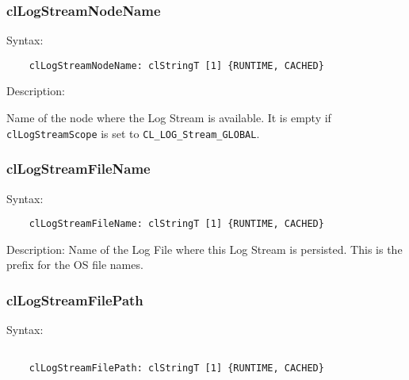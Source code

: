 \begin{flushleft}
\subsubsection{clLogStreamNodeName}
\begin{Desc}
\item[Syntax:]
\footnotesize\begin{verbatim}        	
	clLogStreamNodeName: clStringT [1] {RUNTIME, CACHED}
	\end{verbatim}
	\normalsize
	\end{Desc}
\begin{Desc}
\item[Description:]

Name of the node where the Log Stream is available. It is empty if {\tt{clLogStreamScope}} is set to {\tt{CL\_\-LOG\_\-Stream\_\-GLOBAL}}.
\end{Desc}


\subsubsection{clLogStreamFileName}
\begin{Desc}
\item[Syntax:]
\footnotesize\begin{verbatim}        	
	clLogStreamFileName: clStringT [1] {RUNTIME, CACHED}
	\end{verbatim}
	\normalsize
\end{Desc}
\begin{Desc}
\item[Description:]
Name of the Log File where this Log Stream is persisted. This is the prefix for the OS file names.
\end{Desc}


\subsubsection{clLogStreamFilePath}
\begin{Desc}
\item[Syntax:]
\footnotesize\begin{verbatim}        	

	clLogStreamFilePath: clStringT [1] {RUNTIME, CACHED}
	\end{verbatim}
	\normalsize

\end{Desc}


\end{flushleft}
